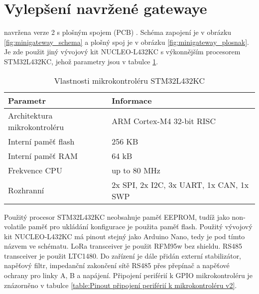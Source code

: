 \section{Vylepšení navržené gatewaye}
\DIFdelbegin {}\DIFdelend \DIFaddbegin {}\DIFaddend navržena \DIFaddbegin {}\DIFaddend verze 2 s \DIFdelbegin {}\DIFdelend plošným spojem (PCB) \DIFaddbegin {}\DIFaddend .
Schéma zapojení je v obrázku \ref{fig:minigateway_schema} a plošný spoj je v obrázku \ref{fig:minigateway_plosnak}.
Je zde použit jiný vývojový kit NUCLEO-L432KC \cite{nucleo-l432KC_ST} s výkonnějším procesorem STM32L432KC, jehož parametry jsou v tabulce \ref{tab:mcuFeatures_stm43l432kc}. 

\begin{longtable}{|l|p{3.5cm}|}
    \caption{Vlastnosti mikrokontroléru STM32L432KC \cite{nucleo-l432KC_ST}}
    \label{tab:mcuFeatures_stm43l432kc} \\
    \hline

    Parametr          & Informace            \\ \hline \hline

    Architektura mikrokontroléru & ARM Cortex-M4 32-bit RISC \\ \hline
    Interní paměť flash       & 256 KB \\ \hline
    Interní paměť RAM         & 64 kB \\ \hline
    Frekvence CPU               & up to 80 MHz \\ \hline
    Rozhranní                  & 2x SPI, 2x I2C, 3x UART, 1x CAN, 1x SWP \\ \hline

\end{longtable}

Použitý procesor STM32L432KC neobsahuje paměť EEPROM, tudíž jako non-volatile paměť pro ukládání konfigurace je použita paměť flash.
Použitý vývojový kit NUCLEO-L432KC má pinout stejný jako Arduino Nano, tedy je pod tímto názvem ve schématu.
LoRa transceiver je použit RFM95w \cite{RFM95w} bez shieldu.
RS485 transceiver je použit LTC1480. 
Do zařízení je dále přidán externí stabilizátor, napěťový filtr, \DIFaddbegin {}\DIFaddend impedanční zakončení sítě RS485 přes přepínač a napěťové ochrany pro linky A, B a napájení. 
Připojení periférií k GPIO mikrokontroléru je znázorněno v tabulce \ref{table:Pinout připojení periférií k mikrokontroléru v2}.

